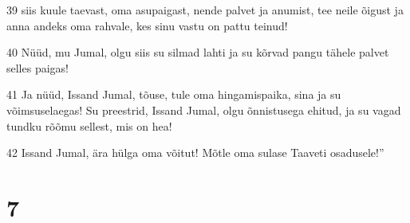 \par 39 siis kuule taevast, oma asupaigast, nende palvet ja anumist, tee neile õigust ja anna andeks oma rahvale, kes sinu vastu on pattu teinud!
\par 40 Nüüd, mu Jumal, olgu siis su silmad lahti ja su kõrvad pangu tähele palvet selles paigas!
\par 41 Ja nüüd, Issand Jumal, tõuse, tule oma hingamispaika, sina ja su võimsuselaegas! Su preestrid, Issand Jumal, olgu õnnistusega ehitud, ja su vagad tundku rõõmu sellest, mis on hea!
\par 42 Issand Jumal, ära hülga oma võitut! Mõtle oma sulase Taaveti osadusele!”

\chapter{7}


